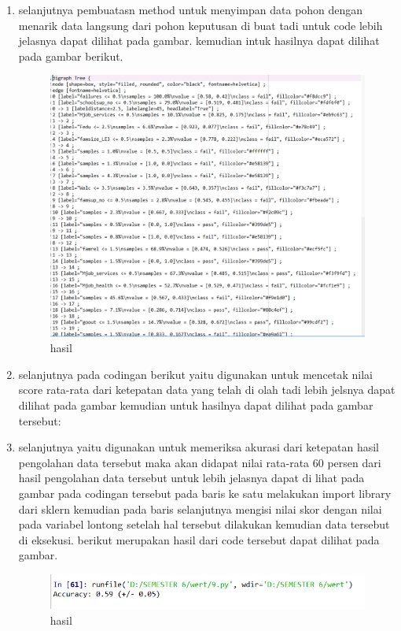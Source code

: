 \begin{enumerate}
\item selanjutnya pembuatasn method untuk menyimpan data pohon dengan menarik data langsung dari pohon keputusan di buat tadi untuk code lebih jelasnya dapat dilihat pada gambar. kemudian intuk hasilnya dapat dilihat pada gambar berikut.

\begin{figure}[ht]
\centering
\includegraphics[scale=0.5]{figures/1174050/chapter2/15.PNG}
\caption{hasil}
\label{contoh}
\end{figure}

\item selanjutnya pada codingan berikut yaitu digunakan untuk mencetak nilai score rata-rata dari ketepatan data yang telah di olah tadi lebih jelsnya dapat dilihat pada gambar kemudian untuk hasilnya dapat dilihat pada gambar tersebut:


\item selanjutnya yaitu digunakan untuk memeriksa akurasi dari ketepatan hasil pengolahan data tersebut maka akan didapat nilai rata-rata 60 persen dari hasil pengolahan data tersebut untuk lebih jelasnya dapat di lihat pada gambar pada codingan tersebut pada baris ke satu melakukan import library dari sklern kemudian pada baris selanjutnya mengisi nilai skor dengan nilai pada variabel lontong setelah hal tersebut dilakukan kemudian data tersebut di eksekusi. berikut merupakan hasil dari code tersebut dapat dilihat pada gambar.

\begin{figure}[ht]
\centering
\includegraphics[scale=0.5]{figures/1174050/chapter2/16.PNG}
\caption{hasil}
\label{contoh}
\end{figure}


\end{enumerate}
